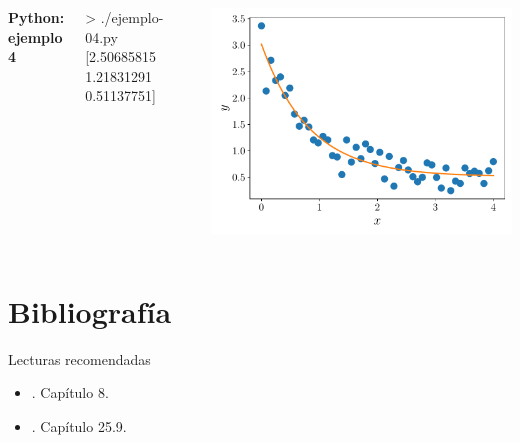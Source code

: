 \documentclass[9pt, aspectratio=169]{beamer}
\begin{document}
\begin{frame}[fragile]
\begin{columns}
\cx
\textbf{Python: ejemplo 4}

\begin{shell}
> ./ejemplo-04.py 
[2.50685815 1.21831291 0.51137751]
\end{shell}

\cx
\begin{center}
\includegraphics[scale=0.40]{code/ejem-04.pdf}
\end{center}

\end{columns}
\end{frame}


\section*{Bibliografía}
\begin{frame}[allowframebreaks]{Lecturas recomendadas}
\begin{itemize}
    \item {}. Capítulo 8.
    \item {}. Capítulo 25.9.
\end{itemize}
\end{frame}
\end{document}
